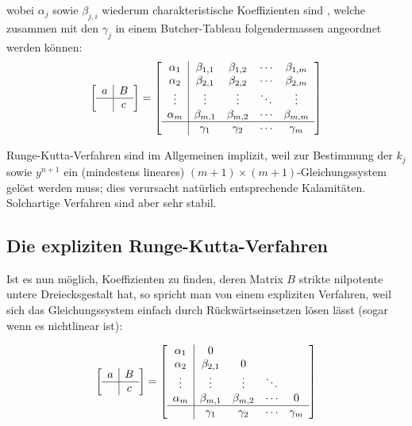 \documentclass[11pt]{article} %
\theoremstyle{definition}
\begin{document}
wobei $\alpha_j$ sowie $\beta_{j,i}$ wiederum charakteristische Koeffizienten sind \cite{Massjung, wiki:RungeKutta}, welche zusammen mit den $\gamma_j$ in einem Butcher-Tableau folgendermassen angeordnet werden können:
\[
\begin{bmatrix}
\begin{array}{c|c}
a & B\\
\hline     & c \\
\end{array}
\end{bmatrix} = \begin{bmatrix}
\begin{array}{c|cccc}
  \alpha_1    & \beta_{1,1} & \beta_{1,2}& \cdots & \beta_{1,m}\\
  \alpha_2    & \beta_{2,1} & \beta_{2,2}& \cdots & \beta_{2,m}\\
  \vdots & \vdots & \vdots& \ddots& \vdots\\
  \alpha_m    & \beta_{m,1} & \beta_{m,2}& \cdots & \beta_{m,m}\\
  \hline & \gamma_1    & \gamma_2   & \cdots & \gamma_m\\
\end{array}

\end{bmatrix}
\]

Runge-Kutta-Verfahren sind im Allgemeinen implizit, weil zur Bestimmung der $k_j$ sowie $y^{n+1}$ ein (mindestens lineares) $(m+1)\times(m+1)$-Gleichungssystem gelöst werden muss; dies verursacht natürlich entsprechende Kalamitäten. Solchartige Verfahren sind aber sehr stabil.\cite{Deuflhard}

\subsection{Die expliziten Runge-Kutta-Verfahren}

Ist es nun möglich, Koeffizienten zu finden, deren Matrix $B$ strikte nilpotente untere Dreiecksgestalt hat, so spricht man von einem expliziten Verfahren, weil sich das Gleichungssystem einfach durch Rückwärtseinsetzen lösen lässt (sogar wenn es nichtlinear ist):

\[
\begin{bmatrix}
\begin{array}{c|c}
a & B\\
\hline     & c \\
\end{array}
\end{bmatrix} = \begin{bmatrix}
\begin{array}{c|cccc}
  \alpha_1 & 0  \\
  \alpha_2    & \beta_{2,1} & 0\\
  \vdots & \vdots & \vdots& \ddots\\
  \alpha_m    & \beta_{m,1} & \beta_{m,2}& \cdots & 0\\
  \hline & \gamma_1    & \gamma_2   & \cdots & \gamma_m\\
\end{array}

\end{bmatrix}
\]
\end{document}
